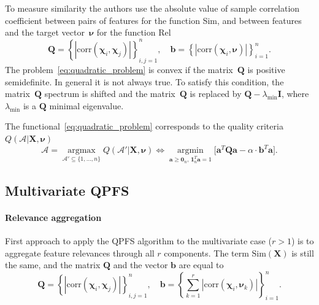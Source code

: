 \documentclass[12pt,twoside]{article}
\newcommand{\ba}{\mathbf{a}}
\newcommand{\bb}{\mathbf{b}}
\newcommand{\bX}{\mathbf{X}}
\newcommand{\bQ}{\mathbf{Q}}
\newcommand{\cA}{\mathcal{A}}
\newcommand{\bchi}{\boldsymbol{\chi}}
\newcommand{\bnu}{\boldsymbol{\nu}}
\newcommand{\bOne}{\boldsymbol{1}}
\newcommand{\bZero}{\boldsymbol{0}}
\newcommand{\argmin}{\mathop{\arg \min}\limits}
\newcommand{\argmax}{\mathop{\arg \max}\limits}
\begin{document}
To measure similarity the authors use the absolute value of sample correlation coefficient between pairs of features for the function Sim, and between features and the target vector~$\bnu$ for the function Rel
\begin{equation}
	\bQ = \left\{\left|\text{corr}(\bchi_i, \bchi_j)\right|\right\}_{i,j=1}^n, \quad \bb = \left\{\left|\text{corr}(\bchi_i, \bnu)\right|\right\}_{i=1}^n.
	\label{eq:qpfs_1d_qb}
\end{equation}
The problem~\eqref{eq:quadratic_problem} is convex if the matrix~$\bQ$ is positive semidefinite. In general it is not always true.
To satisfy this condition, the matrix~$\bQ$ spectrum is shifted and the matrix~$\bQ$ is replaced by $\bQ - \lambda_{\text{min}} \mathbf{I}$, where $\lambda_{\text{min}} $ is a $\bQ$ minimal eigenvalue.

The functional~\eqref{eq:quadratic_problem} corresponds to the quality criteria~$Q(\cA | \bX, \bnu)$
\begin{equation}
\cA = \argmax_{\cA' \subseteq \{1, \dots, n\}} Q(\cA' | \bX, \bnu) \Leftrightarrow \argmin_{\ba \geq \bZero_n, \, \bOne_n^T\ba=1} \bigl[\ba^T \bQ \ba - \alpha \cdot \mathbf{b}^T \ba \bigr].
\end{equation}

\subsection{Multivariate QPFS}

\paragraph{Relevance aggregation}

First approach to apply the QPFS algorithm to the multivariate case ($r > 1$) is to aggregate feature relevances through all $r$ components. The term $\text{Sim}(\bX)$ is still the same, and the matrix $\bQ$ and the vector $\bb$ are equal to
\begin{equation*}
\bQ = \left\{\left|\text{corr}(\bchi_i, \bchi_j)\right|\right\}_{i,j=1}^n, \quad \bb = \left\{\sum_{k=1}^r\left|\text{corr}(\bchi_i, \bnu_k)\right|\right\}_{i=1}^n.
\end{equation*}
\end{document}
